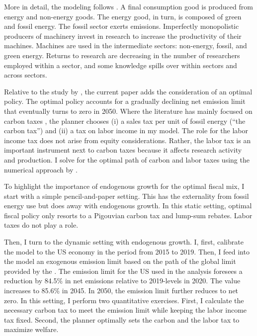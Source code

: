More in detail, the modeling follows \cite{Fried2018ClimateAnalysis}. A final consumption good is produced from energy and non-energy goods. The energy good, in turn, is composed of green and fossil energy. The fossil sector exerts emissions. Imperfectly monopolistic producers of machinery invest in research to increase the productivity of their machines. Machines are used in the intermediate sectors: non-energy, fossil, and green energy. Returns to research are decreasing in the number of researchers employed within a sector, and some knowledge spills over within sectors and across sectors.

Relative to the study by \cite{Fried2018ClimateAnalysis}, the current paper adds the consideration of an optimal policy. The optimal policy accounts for a gradually declining  net emission limit that eventually turns to zero in 2050. Where the literature  has mainly focused on carbon taxes \citep{Acemoglu2012TheChange, Fried2018ClimateAnalysis}, the planner chooses (i) a sales tax per unit of fossil energy (“the carbon tax”) and (ii) a tax on labor income in my model. The role for the labor income tax does not arise from equity considerations. Rather, the labor tax is an important instrument next to carbon taxes because it affects research activity and production.  I solve for the optimal path of carbon and labor taxes using the numerical approach by  \citep{Jones1993OptimalGrowth, Barrage2019OptimalPolicy}.

To highlight the importance of endogenous growth for the optimal fiscal mix, I start with a simple pencil-and-paper setting. This has the externality from fossil energy use but does away with endogenous growth. In this static setting, optimal fiscal policy only resorts to a Pigouvian carbon tax and lump-sum rebates. Labor taxes do not play a role.

Then, I turn to the dynamic setting with endogenous growth. I, first, calibrate the model to the US economy in the period from 2015 to 2019. Then, I feed into the model an exogenous emission limit based on the path of the global limit provided by the \cite{IPCC2022}. The emission limit for the US used in the analysis foresees a reduction by 84.5\% in net emissions relative to 2019-levels in 2020. The value increases to 85.6\% in 2045. In 2050, the emission limit further reduces to net zero. In this setting, I perform two quantitative exercises. First, I calculate the necessary carbon tax to meet the emission limit while keeping the labor income tax fixed. Second,  the planner optimally sets the carbon and the labor tax to maximize welfare.


